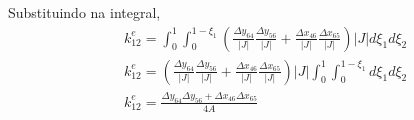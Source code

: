 %
Substituindo na integral,
%
\begin{equation}
\begin{split}
	&k^e_{12} = \int_{0}^{1} \int_{0}^{1-\xi_1} \left(\frac{\Delta y_{64}}{|J|} \frac{\Delta y_{56}}{|J|} + \frac{\Delta x_{46}}{|J|} \frac{\Delta x_{65}}{|J|} \right) |J| d \xi_1 d \xi_2\\
	& k^e_{12} = \left(\frac{\Delta y_{64}}{|J|} \frac{\Delta y_{56}}{|J|} + \frac{\Delta x_{46}}{|J|} \frac{\Delta x_{65}}{|J|} \right) |J| \int_{0}^{1} \int_{0}^{1-\xi_1} d \xi_1 d \xi_2\\
	& k^e_{12} = \frac{\Delta y_{64} \Delta y_{56} + \Delta x_{46} \Delta x_{65}}{4 A}
\end{split}
\end{equation}
%


